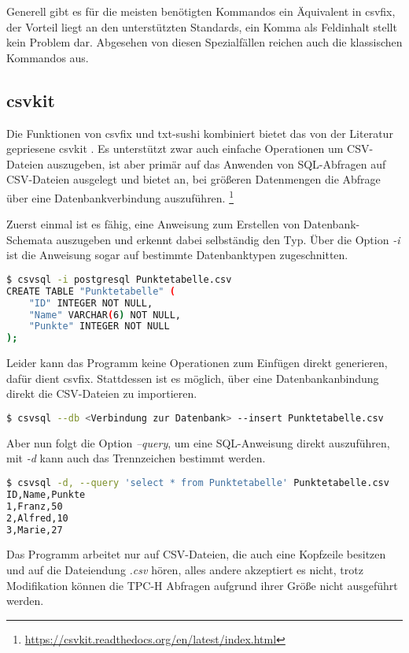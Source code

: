 Generell gibt es für die meisten benötigten Kommandos ein Äquivalent in csvfix, der Vorteil liegt an den unterstützten Standards, ein Komma als Feldinhalt stellt kein Problem dar. Abgesehen von diesen Spezialfällen reichen auch die klassischen Kommandos aus.

\subsection{csvkit}
Die Funktionen von csvfix und txt-sushi kombiniert bietet das von der Literatur gepriesene csvkit \cite{DataScience}. Es unterstützt zwar auch einfache Operationen um CSV-Dateien auszugeben, ist aber primär auf das Anwenden von SQL-Abfragen auf CSV-Dateien ausgelegt und bietet an, bei größeren Datenmengen die Abfrage über eine Datenbankverbindung auszuführen.
\footnote{\url{https://csvkit.readthedocs.org/en/latest/index.html}}

Zuerst einmal ist es fähig, eine Anweisung zum Erstellen von Datenbank-Schemata auszugeben und erkennt dabei selbständig den Typ. Über die Option \textit{-i} ist die Anweisung sogar auf bestimmte Datenbanktypen zugeschnitten.
\begin{lstlisting}[language=Bash]
$ csvsql -i postgresql Punktetabelle.csv
CREATE TABLE "Punktetabelle" (
	"ID" INTEGER NOT NULL, 
	"Name" VARCHAR(6) NOT NULL, 
	"Punkte" INTEGER NOT NULL
);
\end{lstlisting}

Leider kann das Programm keine Operationen zum Einfügen direkt generieren, dafür dient csvfix. Stattdessen ist es möglich, über eine Datenbankanbindung direkt die CSV-Dateien zu importieren.

\begin{lstlisting}[language=Bash]
$ csvsql --db <Verbindung zur Datenbank> --insert Punktetabelle.csv
\end{lstlisting}

Aber nun folgt die Option \textit{--query}, um eine SQL-Anweisung direkt auszuführen, mit \textit{-d} kann auch das Trennzeichen bestimmt werden.

\begin{lstlisting}[language=Bash]
$ csvsql -d, --query 'select * from Punktetabelle' Punktetabelle.csv
ID,Name,Punkte
1,Franz,50
2,Alfred,10
3,Marie,27
\end{lstlisting}

Das Programm arbeitet nur auf CSV-Dateien, die auch eine Kopfzeile besitzen und auf die Dateiendung \textit{.csv} hören, alles andere akzeptiert es nicht, trotz Modifikation können die TPC-H Abfragen aufgrund ihrer Größe nicht ausgeführt werden.

